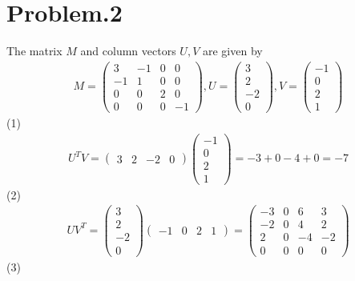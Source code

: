 \documentclass[12pt]{article}
\begin{document}
\section*{Problem.2}
The matrix $M$ and column vectors $U, V$ are given by
\begin{gather*}
M =
\begin{pmatrix}
3 & -1 & 0 & 0 \\
-1 & 1 & 0 & 0 \\
0 & 0 & 2 & 0 \\
0 & 0 & 0 & -1
\end{pmatrix}
, U =
\begin{pmatrix}
3\\ 2 \\ -2 \\ 0
\end{pmatrix}
, V =
\begin{pmatrix}
-1\\ 0 \\ 2 \\ 1
\end{pmatrix}
\end{gather*}
(1)
\begin{align*}
U^T V =
\begin{pmatrix}
3& 2 & -2 & 0
\end{pmatrix}
\begin{pmatrix}
-1\\ 0 \\ 2 \\ 1
\end{pmatrix}
= -3 + 0 - 4 + 0 = -7
\end{align*}
(2)
\begin{align*}
U V^T = 
\begin{pmatrix}
3\\ 2 \\ -2 \\ 0
\end{pmatrix}
\begin{pmatrix}
-1& 0 & 2 & 1
\end{pmatrix}
=
\begin{pmatrix}
-3 & 0 & 6 & 3 \\
-2 & 0 & 4 & 2 \\
2 & 0 & -4 & -2 \\
0 & 0 & 0 & 0
\end{pmatrix}
\end{align*}
(3)
\end{document}
